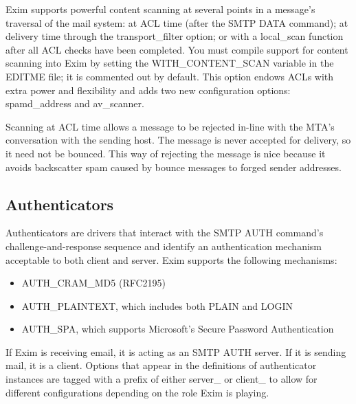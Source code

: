 Exim supports powerful content scanning at several points in a message's
traversal of the mail system: at ACL time (after the SMTP DATA command);
at delivery time through the {transport\_filter} option; or with a
{local\_scan} function after all ACL checks have been completed. You
must compile support for content scanning into Exim by setting the
{WITH\_CONTENT\_SCAN} variable in the {EDITME} file; it is commented out
by default. This option endows ACLs with extra power and flexibility and
adds two new configuration options: {spamd\_address} and {av\_scanner}.

Scanning at ACL time allows a message to be rejected in-line with the
MTA's conversation with the sending host. The message is never accepted
for delivery, so it need not be bounced. This way of rejecting the
message is nice because it avoids backscatter spam caused by bounce
messages to forged sender addresses.

\protect\hypertarget{part0026_split_049.html}{}{}

\hypertarget{part0026_split_049.htmlux5cux23_idContainer1247}{}
\hypertarget{part0026_split_049.htmlux5cux23calibre_pb_48}{%
\subsection[Authenticators]{\texorpdfstring{\protect\hypertarget{part0026_split_049.htmlux5cux23_idTextAnchor1144}{}{}Auth\protect\hypertarget{part0026_split_049.htmlux5cux23_idTextAnchor1145}{}{}enticators}{Authenticators}}\label{part0026_split_049.htmlux5cux23calibre_pb_48}}

\protect\hypertarget{part0026_split_049.htmlux5cux23_idIndexMarker2652}{}{}Authenticators
are drivers that interact with the SMTP AUTH command's
challenge-and-response sequence and identify an authentication mechanism
acceptable to both client and server. Exim supports the following
mechanisms:

\begin{itemize}
\tightlist
\item
  {AUTH\_CRAM\_MD5} (RFC2195)
\item
  {AUTH\_PLAINTEXT}, which includes both PLAIN and LOGIN
\item
  {AUTH\_SPA}, which supports Microsoft's Secure Password Authentication
\end{itemize}

If Exim is receiving email, it is acting as an SMTP AUTH server. If it
is sending mail, it is a client. Options that appear in the definitions
of authenticator instances are tagged with a prefix of either {server\_}
or {client\_} to allow for different configurations depending on the
role Exim is playing.

